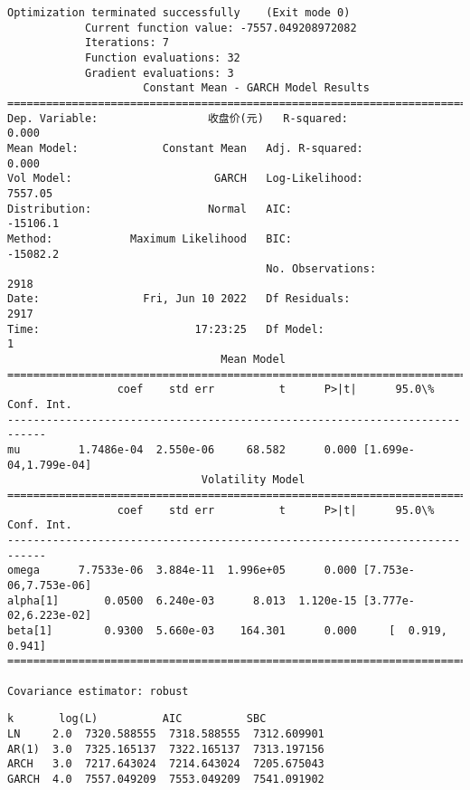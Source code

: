 \documentclass[11pt]{article}
\makeatletter
\newcommand{\boxspacing}{\kern\kvtcb@left@rule\kern\kvtcb@boxsep}
\newcommand{\prompt}[4]{
        {\ttfamily\llap{{\color{#2}[#3]:\hspace{3pt}#4}}\vspace{-\baselineskip}}
    }
\makeatother
\begin{document}
    \begin{Verbatim}[commandchars=\\\{\}]
Optimization terminated successfully    (Exit mode 0)
            Current function value: -7557.049208972082
            Iterations: 7
            Function evaluations: 32
            Gradient evaluations: 3
                     Constant Mean - GARCH Model Results
==============================================================================
Dep. Variable:                 收盘价(元)   R-squared:                       0.000
Mean Model:             Constant Mean   Adj. R-squared:                  0.000
Vol Model:                      GARCH   Log-Likelihood:                7557.05
Distribution:                  Normal   AIC:                          -15106.1
Method:            Maximum Likelihood   BIC:                          -15082.2
                                        No. Observations:                 2918
Date:                Fri, Jun 10 2022   Df Residuals:                     2917
Time:                        17:23:25   Df Model:                            1
                                 Mean Model
============================================================================
                 coef    std err          t      P>|t|      95.0\% Conf. Int.
----------------------------------------------------------------------------
mu         1.7486e-04  2.550e-06     68.582      0.000 [1.699e-04,1.799e-04]
                              Volatility Model
============================================================================
                 coef    std err          t      P>|t|      95.0\% Conf. Int.
----------------------------------------------------------------------------
omega      7.7533e-06  3.884e-11  1.996e+05      0.000 [7.753e-06,7.753e-06]
alpha[1]       0.0500  6.240e-03      8.013  1.120e-15 [3.777e-02,6.223e-02]
beta[1]        0.9300  5.660e-03    164.301      0.000     [  0.919,  0.941]
============================================================================

Covariance estimator: robust
    \end{Verbatim}

            \begin{tcolorbox}[breakable, size=fbox, boxrule=.5pt, pad at break*=1mm, opacityfill=0]
\prompt{Out}{outcolor}{5}{\boxspacing}
\begin{Verbatim}[commandchars=\\\{\}]
         k       log(L)          AIC          SBC
LN     2.0  7320.588555  7318.588555  7312.609901
AR(1)  3.0  7325.165137  7322.165137  7313.197156
ARCH   3.0  7217.643024  7214.643024  7205.675043
GARCH  4.0  7557.049209  7553.049209  7541.091902
\end{Verbatim}
\end{tcolorbox}
\end{document}
